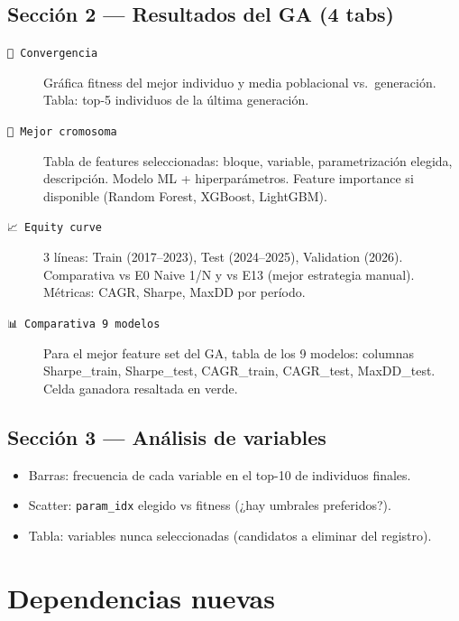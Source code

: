 \documentclass[12pt,letterpaper]{article}
\begin{document}
\subsection{Sección 2 — Resultados del GA (4 tabs)}

\begin{description}
  \item[\texttt{🧬 Convergencia}]
    Gráfica fitness del mejor individuo y media poblacional vs.\ generación.
    Tabla: top-5 individuos de la última generación.

  \item[\texttt{🔬 Mejor cromosoma}]
    Tabla de features seleccionadas: bloque, variable, parametrización elegida,
    descripción. Modelo ML + hiperparámetros. Feature importance si disponible
    (Random Forest, XGBoost, LightGBM).

  \item[\texttt{📈 Equity curve}]
    3 líneas: Train (2017--2023), Test (2024--2025), Validation (2026).
    Comparativa vs E0 Naive 1/N y vs E13 (mejor estrategia manual).
    Métricas: CAGR, Sharpe, MaxDD por período.

  \item[\texttt{📊 Comparativa 9 modelos}]
    Para el mejor feature set del GA, tabla de los 9 modelos:
    columnas Sharpe\_train, Sharpe\_test, CAGR\_train, CAGR\_test, MaxDD\_test.
    Celda ganadora resaltada en verde.
\end{description}

\subsection{Sección 3 — Análisis de variables}

\begin{itemize}[leftmargin=2em]
  \item Barras: frecuencia de cada variable en el top-10 de individuos finales.
  \item Scatter: \texttt{param\_idx} elegido vs fitness (¿hay umbrales preferidos?).
  \item Tabla: variables nunca seleccionadas (candidatos a eliminar del registro).
\end{itemize}

\section{Dependencias nuevas}
\end{document}
